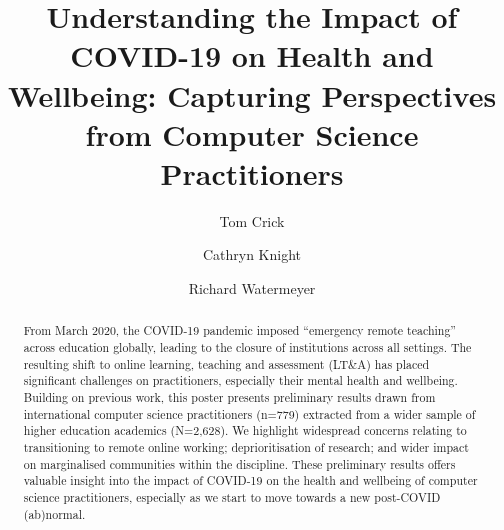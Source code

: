 \documentclass[manuscript,review]{acmart}
\begin{document}
\title[Understanding the Impact of COVID-19 on Health and Wellbeing]{Understanding the Impact of COVID-19 on Health and Wellbeing: Capturing Perspectives from Computer Science Practitioners}

\author{Tom Crick}

\author{Cathryn Knight}

\author{Richard Watermeyer}

\renewcommand{\shortauthors}{Crick, et al.}

\begin{abstract}
From March 2020, the COVID-19 pandemic imposed ``emergency remote
teaching'' across education globally, leading to the closure of
institutions across all settings. The resulting shift to online
learning, teaching and assessment (LT\&A) has placed significant
challenges on practitioners, especially their mental health and
wellbeing. Building on previous work, this poster presents preliminary
results drawn from international computer science practitioners
(n=779) extracted from a wider sample of higher education academics
(N=2,628). We highlight widespread concerns relating to transitioning
to remote online working; deprioritisation of research; and wider
impact on marginalised communities within the discipline. These
preliminary results offers valuable insight into the impact of
COVID-19 on the health and wellbeing of computer science
practitioners, especially as we start to move towards a new post-COVID
(ab)normal.
\end{abstract}
\end{document}
